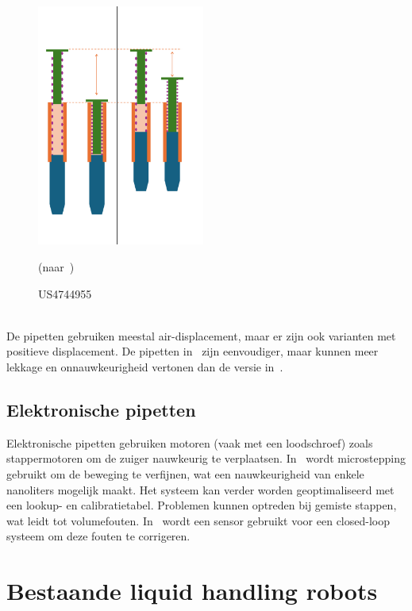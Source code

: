 \begin{minipage}[t]{0.49\textwidth} 
    \vspace{0pt} 
    \begin{figure}[H] 
        \centering 
        \includegraphics[width=0.49\textwidth]{figures/Werking US4744955.png} 
        \caption{US4744955}\label{fig:werking US4744955}
        (naar\ \cite{RN16})
    \end{figure} 
\end{minipage} 
\\[12pt]De pipetten gebruiken meestal air-displacement, maar er zijn ook varianten met positieve displacement. De pipetten in\ \cite{RN16} zijn eenvoudiger, maar kunnen meer lekkage en onnauwkeurigheid vertonen dan de versie in\ \cite{RN17}.

\subsection{Elektronische pipetten} 
Elektronische pipetten gebruiken motoren (vaak met een loodschroef) zoals stappermotoren om de zuiger nauwkeurig te verplaatsen. In\ \cite{RN35} wordt microstepping gebruikt om de beweging te verfijnen, wat een nauwkeurigheid van enkele nanoliters mogelijk maakt. Het systeem kan verder worden geoptimaliseerd met een lookup- en calibratietabel. Problemen kunnen optreden bij gemiste stappen, wat leidt tot volumefouten. In\ \cite{RN36} wordt een sensor gebruikt voor een closed-loop systeem om deze fouten te corrigeren.

\section{Bestaande liquid handling robots} 
